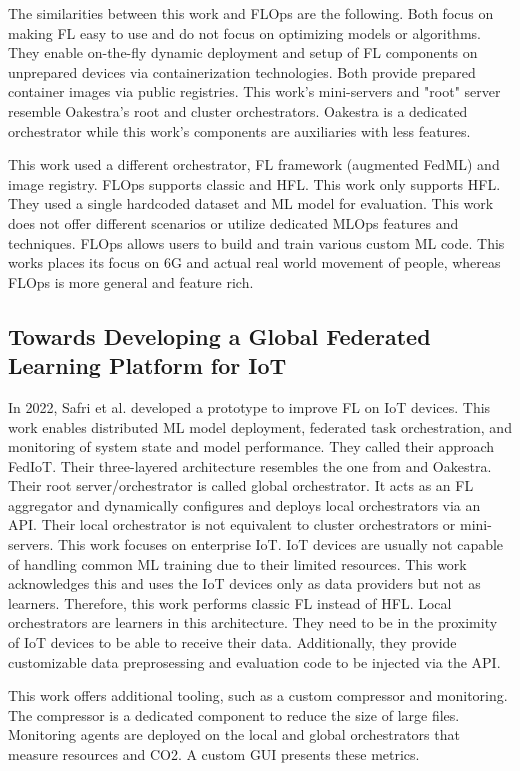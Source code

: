 The similarities between this work and FLOps are the following.
Both focus on making FL easy to use and do not focus on optimizing models or algorithms.
They enable on-the-fly dynamic deployment and setup of FL components on unprepared devices via containerization technologies.
Both provide prepared container images via public registries.
This work's mini-servers and "root" server resemble Oakestra's root and cluster orchestrators.
Oakestra is a dedicated orchestrator while this work's components are auxiliaries with less features.

This work used a different orchestrator, FL framework (augmented FedML) and image registry.
FLOps supports classic and HFL.
This work only supports HFL.
They used a single hardcoded dataset and ML model for evaluation.
This work does not offer different scenarios or utilize dedicated MLOps features and techniques.
FLOps allows users to build and train various custom ML code.
This works places its focus on 6G and actual real world movement of people, whereas FLOps is more general and feature rich.


\subsection{Towards Developing a Global Federated Learning Platform for IoT}
In 2022, Safri et al. \cite{paper:global_fl_platform_for_iot} developed a prototype to improve FL on IoT devices.
This work enables distributed ML model deployment, federated task orchestration, and monitoring of system state and model performance.
They called their approach FedIoT.
Their three-layered architecture resembles the one from \cite{paper:fl_toward_on_demand_client_deployment_at_edge} and Oakestra.
Their root server/orchestrator is called global orchestrator.
It acts as an FL aggregator and dynamically configures and deploys local orchestrators via an API.
Their local orchestrator is not equivalent to cluster orchestrators or mini-servers.
This work focuses on enterprise IoT.
IoT devices are usually not capable of handling common ML training due to their limited resources.
This work acknowledges this and uses the IoT devices only as data providers but not as learners.
Therefore, this work performs classic FL instead of HFL.
Local orchestrators are learners in this architecture.
They need to be in the proximity of IoT devices to be able to receive their data.
Additionally, they provide customizable data preprosessing and evaluation code to be injected via the API.

This work offers additional tooling, such as a custom compressor and monitoring.
The compressor is a dedicated component to reduce the size of large files.
Monitoring agents are deployed on the local and global orchestrators that measure resources and CO2.
A custom GUI presents these metrics.

